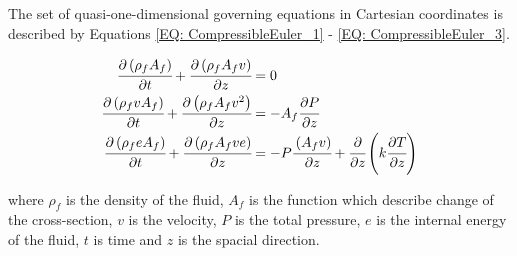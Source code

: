 \documentclass[a4paper,fleqn]{cas-dc}
\begin{document}
	The set of quasi-one-dimensional governing equations in Cartesian coordinates is described by Equations \ref{EQ: CompressibleEuler_1} - \ref{EQ: CompressibleEuler_3}.

{\footnotesize
	\begin{align}
		\label{EQ: CompressibleEuler_1}
		\cfrac{\partial \left( \rho_f A_f \right) }{\partial t} + \cfrac{\partial \left( \rho_f A_f v \right)}{\partial z} &= 0 \\
		\cfrac{\partial \left( \rho_f v A_f \right) }{\partial t} + \cfrac{\partial \left( \rho_f A_f v^2 \right)}{\partial z} &= -A_f \cfrac{\partial P}{\partial z} \label{EQ: CompressibleEuler_2} \\
		\cfrac{\partial \left( \rho_f e A_f \right) }{\partial t} + \cfrac{\partial \left( \rho_f A_f v e\right)}{\partial z} &= -P\cfrac{\left( A_f v \right)}{\partial z} + \cfrac{\partial}{\partial z} \left( k \cfrac{\partial T}{\partial z} \right)   
		\label{EQ: CompressibleEuler_3}
	\end{align}  
}

where $\rho_f$ is the density of the fluid, $A_f$ is the function which describe change of the cross-section, $v$ is the velocity, $P$ is the total pressure, $e$ is the internal energy of the fluid, $t$ is time and $z$ is the spacial direction.
\end{document}

